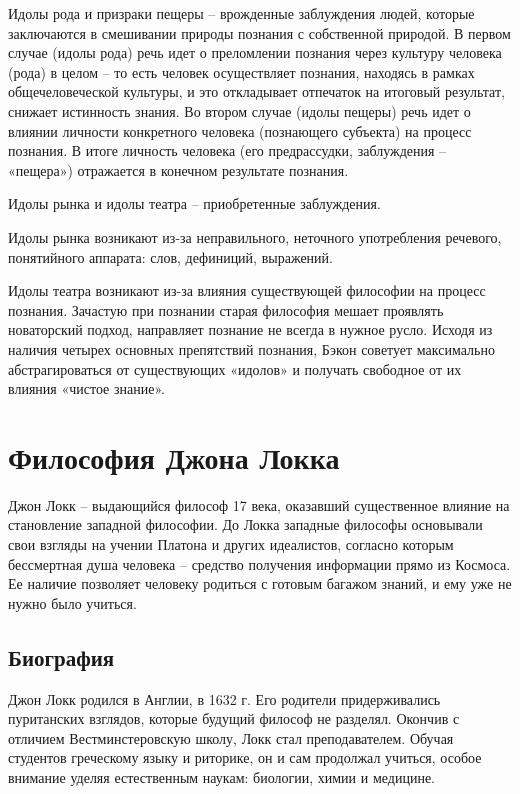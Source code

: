 \documentclass[
]{article}
\begin{document}
Идолы рода и призраки пещеры -- врожденные заблуждения людей, которые
заключаются в смешивании природы познания с собственной природой. В
первом случае (идолы рода) речь идет о преломлении познания через
культуру человека (рода) в целом -- то есть человек осуществляет
познания, находясь в рамках общечеловеческой культуры, и это откладывает
отпечаток на итоговый результат, снижает истинность знания. Во втором
случае (идолы пещеры) речь идет о влиянии личности конкретного человека
(познающего субъекта) на процесс познания. В итоге личность человека
(его предрассудки, заблуждения -- «пещера») отражается в конечном
результате познания.

Идолы рынка и идолы театра -- приобретенные заблуждения.

Идолы рынка возникают из-за неправильного, неточного употребления
речевого, понятийного аппарата: слов, дефиниций, выражений.

Идолы театра возникают из-за влияния существующей философии на процесс
познания. Зачастую при познании старая философия мешает проявлять
новаторский подход, направляет познание не всегда в нужное русло. Исходя
из наличия четырех основных препятствий познания, Бэкон советует
максимально абстрагироваться от существующих «идолов» и получать
свободное от их влияния «чистое знание».

\hypertarget{ux444ux438ux43bux43eux441ux43eux444ux438ux44f-ux434ux436ux43eux43dux430-ux43bux43eux43aux43aux430}{%
\section{Философия Джона
Локка}\label{ux444ux438ux43bux43eux441ux43eux444ux438ux44f-ux434ux436ux43eux43dux430-ux43bux43eux43aux43aux430}}

Джон Локк -- выдающийся философ 17 века, оказавший существенное влияние
на становление западной философии. До Локка западные философы основывали
свои взгляды на учении Платона и других идеалистов, согласно которым
бессмертная душа человека -- средство получения информации прямо из
Космоса. Ее наличие позволяет человеку родиться с готовым багажом
знаний, и ему уже не нужно было учиться.

\hypertarget{ux431ux438ux43eux433ux440ux430ux444ux438ux44f-3}{%
\subsection{Биография}\label{ux431ux438ux43eux433ux440ux430ux444ux438ux44f-3}}

Джон Локк родился в Англии, в 1632 г. Его родители придерживались
пуританских взглядов, которые будущий философ не разделял. Окончив с
отличием Вестминстеровскую школу, Локк стал преподавателем. Обучая
студентов греческому языку и риторике, он и сам продолжал учиться,
особое внимание уделяя естественным наукам: биологии, химии и медицине.
\end{document}
